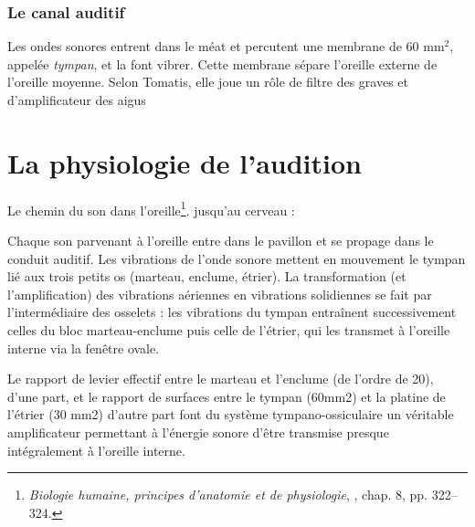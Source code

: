 \subsubsection{Le canal auditif}

Les ondes sonores entrent dans le méat et percutent
une membrane de 60 mm$^2$, appelée \emph{tympan}, et la font vibrer. Cette membrane
sépare l'oreille externe de l'oreille moyenne. Selon Tomatis, elle
joue un rôle de filtre des graves et d'amplificateur des aigus




\section{La physiologie de l'audition}

Le chemin du son dans l'oreille\footnote{\textsl{Biologie humaine, principes d'anatomie et de physiologie}, \cite{marieb:biologie}, chap. 8, pp. 322--324.}. jusqu'au cerveau : 

Chaque son parvenant à l'oreille entre dans le pavillon et se propage
dans le conduit auditif. Les vibrations de l'onde sonore mettent en
mouvement le tympan lié aux trois petits os (marteau, enclume, étrier).
La transformation (et l\textquoteright amplification) des vibrations
aériennes en vibrations solidiennes se fait par l\textquoteright intermédiaire
des osselets : les vibrations du tympan entraînent successivement
celles du bloc marteau-enclume puis celle de l\textquoteright étrier,
qui les transmet à l\textquoteright oreille interne via la fenêtre
ovale.

Le rapport de levier effectif entre le marteau et l\textquoteright enclume
(de l\textquoteright ordre de 20), d\textquoteright une part, et le
rapport de surfaces entre le tympan (60mm2) et la platine de l\textquoteright étrier
(30 mm2) d\textquoteright autre part font du système tympano-ossiculaire
un véritable amplificateur permettant à l\textquoteright énergie sonore
d\textquoteright être transmise presque intégralement à l\textquoteright oreille
interne.

